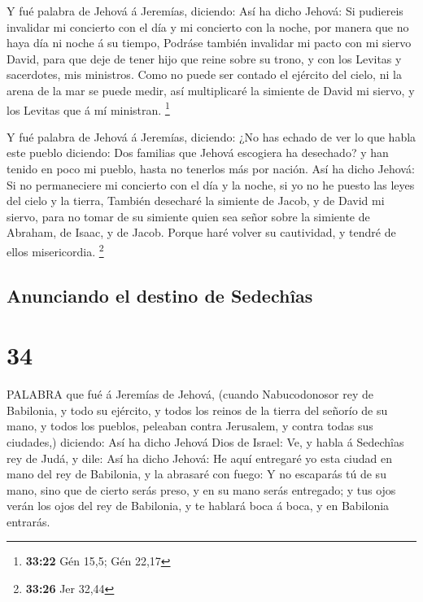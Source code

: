  Y fué palabra de Jehová á Jeremías, diciendo:
 Así ha dicho Jehová: Si pudiereis invalidar mi concierto
con el día y mi concierto con la noche, por manera que no haya día ni
noche á su tiempo,  Podráse también invalidar mi pacto con
mi siervo David, para que deje de tener hijo que reine sobre su trono, y
con los Levitas y sacerdotes, mis ministros.  Como no puede
ser contado el ejército del cielo, ni la arena de la mar se puede medir,
así multiplicaré la simiente de David mi siervo, y los Levitas que á mí
ministran. \footnote{\textbf{33:22} Gén 15,5; Gén 22,17}

 Y fué palabra de Jehová á Jeremías, diciendo:
 ¿No has echado de ver lo que habla este pueblo diciendo:
Dos familias que Jehová escogiera ha desechado? y han tenido en poco mi
pueblo, hasta no tenerlos más por nación.  Así ha dicho
Jehová: Si no permaneciere mi concierto con el día y la noche, si yo no
he puesto las leyes del cielo y la tierra,  También
desecharé la simiente de Jacob, y de David mi siervo, para no tomar de
su simiente quien sea señor sobre la simiente de Abraham, de Isaac, y de
Jacob. Porque haré volver su cautividad, y tendré de ellos misericordia.
\footnote{\textbf{33:26} Jer 32,44}

\hypertarget{anunciando-el-destino-de-sedechuxeeas}{%
\subsection{Anunciando el destino de
Sedechîas}\label{anunciando-el-destino-de-sedechuxeeas}}

\hypertarget{section-33}{%
\section{34}\label{section-33}}

 PALABRA que fué á Jeremías de Jehová, (cuando Nabucodonosor
rey de Babilonia, y todo su ejército, y todos los reinos de la tierra
del señorío de su mano, y todos los pueblos, peleaban contra Jerusalem,
y contra todas sus ciudades,) diciendo:  Así ha dicho Jehová
Dios de Israel: Ve, y habla á Sedechîas rey de Judá, y dile: Así ha
dicho Jehová: He aquí entregaré yo esta ciudad en mano del rey de
Babilonia, y la abrasaré con fuego:  Y no escaparás tú de su
mano, sino que de cierto serás preso, y en su mano serás entregado; y
tus ojos verán los ojos del rey de Babilonia, y te hablará boca á boca,
y en Babilonia entrarás.

